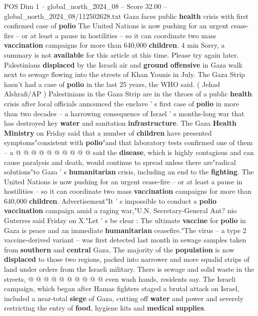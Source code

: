 \begin{textsample}{POS Dim 1 – global\_north\_2024\_08 – Score 32.00 – global\_north\_2024\_08/112502628.txt}  \label{ex:f1_pos_404}
Gaza faces public \textbf{health} crisis with first confirmed case of \textbf{polio} The United Nations is now pushing for an urgent cease-fire -- or at least a pause in hostilities -- so it can coordinate two mass \textbf{vaccination} campaigns for more than 640,000 \textbf{children}. 4 min Sorry, a summary is not \textbf{available} for this article at this time.
Please try again later.
Palestinians \textbf{displaced} by the Israeli air and \textbf{ground} \textbf{offensive} in Gaza walk next to sewage flowing into the streets of Khan Younis in July.
The Gaza Strip hasn't had a case of \textbf{polio} in the last 25 years, the WHO said. ( Jehad Alshrafi/AP ) Palestinians in the Gaza Strip are in the throes of a public \textbf{health} crisis after local officials announced the enclave ' s first case of \textbf{polio} in more than two decades -- a harrowing consequence of Israel ' s months-long war that has destroyed key \textbf{water} and sanitation \textbf{infrastructure}.
The Gaza \textbf{Health} \textbf{Ministry} on Friday said that a number of \textbf{children} have presented symptoms"consistent with \textbf{polio}"and that laboratory tests confirmed one of them -- a @ @ @ @ @ @ @ @ @ @ said the \textbf{disease}, which is highly contagious and can cause paralysis and death, would continue to spread unless there are"radical solutions"to Gaza ' s \textbf{humanitarian} crisis, including an end to the \textbf{fighting}.
The United Nations is now pushing for an urgent cease-fire -- or at least a pause in hostilities -- so it can coordinate two mass \textbf{vaccination} campaigns for more than 640,000 \textbf{children}.
Advertisement"It ' s impossible to conduct a \textbf{polio} \textbf{vaccination} campaign amid a raging war,"U.N.
Secretary-General Ant? nio Guterres said Friday on X."Let ' s be clear : The ultimate \textbf{vaccine} for \textbf{polio} in Gaza is peace and an immediate \textbf{humanitarian} ceasefire."The virus -- a type 2 vaccine-derived variant -- was first detected last month in sewage samples taken from \textbf{southern} and \textbf{central} Gaza.
The majority of the \textbf{population} is now \textbf{displaced} to those two regions, packed into narrower and more squalid strips of land under orders from the Israeli military.
There is sewage and solid waste in the streets, @ @ @ @ @ @ @ @ @ @ even wash hands, residents say.
The Israeli campaign, which began after Hamas fighters staged a brutal attack on Israel, included a near-total \textbf{siege} of Gaza, cutting off \textbf{water} and power and severely restricting the entry of \textbf{food}, hygiene kits and \textbf{medical} \textbf{supplies}.

\end{textsample}
